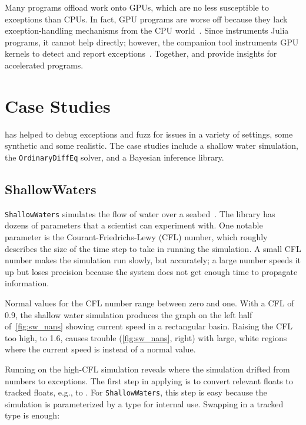 \documentclass{juliacon}
\begin{document}
Many programs offload work onto GPUs, which are no less susceptible to \fp{} exceptions than CPUs.
In fact, GPU programs are worse off because they lack exception-handling mechanisms from the CPU world~\cite{llg-soap-2022}.
Since \FT{} instruments Julia programs, it cannot help directly;
however, the companion tool \GPUFPX{} instruments GPU kernels to detect and report
\fp{} exceptions~\cite{llsflg-hpdc-2023}.
Together, \FT{} and \GPUFPX{} provide insights for accelerated programs.


\section{Case Studies}
\label{s:casestudies}

\FlowFPX{} has helped to debug exceptions and fuzz for issues in a variety
of settings, some synthetic and some realistic.
The case studies include a shallow water simulation, the
\texttt{OrdinaryDiffEq} solver, and a Bayesian inference library.

\subsection{ShallowWaters}
\label{s:sw}

\texttt{ShallowWaters} simulates the flow of water over a
seabed~\cite{klowerNumberFormatsError2020,klowerPositsAlternativeFloats2019}.
The library has dozens of parameters that a scientist can experiment with.
One notable parameter is the Courant-Friedrichs-Lewy (CFL) number, which roughly describes the size of the time step to take in running the simulation.
A small CFL number makes the simulation run slowly, but accurately; a large number speeds it up but loses precision
because the system does not get enough time to propagate information.

Normal values for the CFL number range between zero and one.
With a CFL of 0.9, the shallow water simulation produces the graph on the left half
of~\cref{fig:sw_nans} showing current speed in a rectangular basin.
Raising the CFL too high, to 1.6, causes trouble
(\cref{fig:sw_nans}, right) with large, white regions where the
current speed is \NaN{} instead of a normal value.

Running \FT{} on the high-CFL simulation reveals where the simulation drifted
from numbers to \NaN{} exceptions.
The first step in applying \FT{} is to convert relevant floats to tracked
floats, e.g.,  to .
For \texttt{ShallowWaters}, this step is easy because the simulation is parameterized by
a \fp{} type for internal use.
Swapping in a tracked type is enough:
\end{document}
